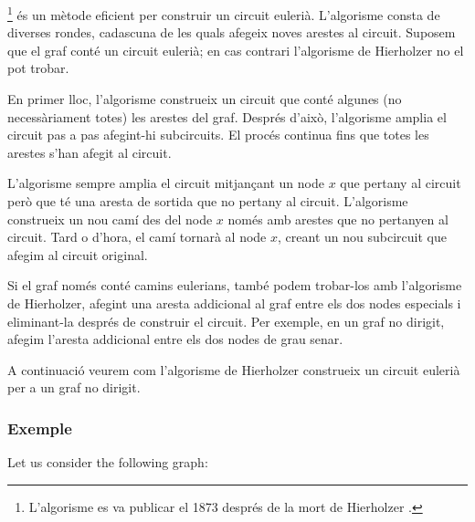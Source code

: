 \footnote{L'algorisme es va publicar el
1873 després de la mort de Hierholzer \cite{hie73}.} és un mètode
eficient per construir un circuit eulerià. L'algorisme consta de
diverses rondes, cadascuna de les quals afegeix noves arestes al
circuit. Suposem que el graf conté un circuit eulerià; en cas contrari
l'algorisme de Hierholzer no el pot trobar.

En primer lloc, l'algorisme construeix un circuit que conté algunes
(no necessàriament totes) les arestes del graf. Després d'això,
l'algorisme amplia el circuit pas a pas afegint-hi subcircuits. El
procés continua fins que totes les arestes s'han afegit al circuit.

L'algorisme sempre amplia el circuit mitjançant un node $x$ que
pertany al circuit però que té una aresta de sortida que no pertany al
circuit.  L'algorisme construeix un nou camí des del node $x$ només
amb arestes que no pertanyen al circuit. Tard o d'hora, el camí
tornarà al node $x$, creant un nou subcircuit que afegim al circuit
original.

Si el graf només conté camins eulerians, també podem trobar-los amb
l'algorisme de Hierholzer, afegint una aresta addicional al graf entre
els dos nodes especials i eliminant-la després de construir el
circuit. Per exemple, en un graf no dirigit, afegim l'aresta
addicional entre els dos nodes de grau senar.

A continuació veurem com l'algorisme de Hierholzer construeix un
circuit eulerià per a un graf no dirigit.

\subsubsection{Exemple}


\begin{samepage}
Let us consider the following graph:
\begin{center}
\end{center}
\end{samepage}



